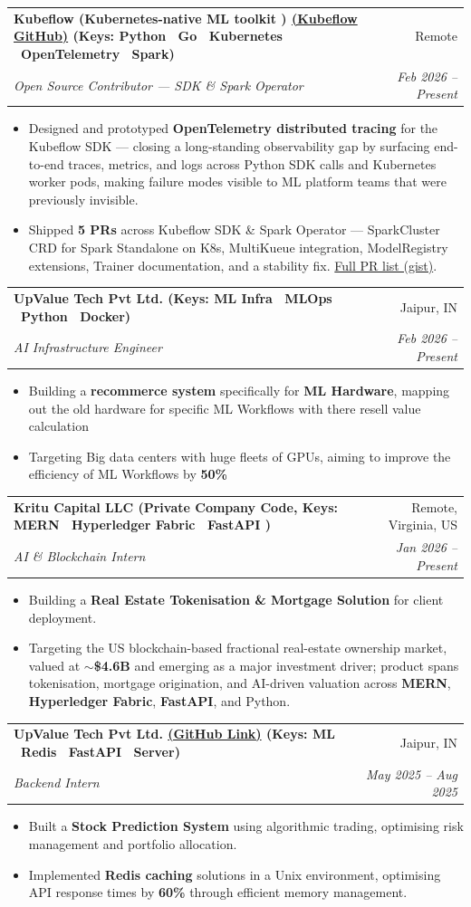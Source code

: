 \documentclass[letterpaper,11pt]{article}
\makeatletter
\newcommand{\resumeItem}[1]{
  \item\small{
    {#1 \vspace{-4pt}}
  }
}
\newcommand{\resumeSubheading}[4]{
  \vspace{-2pt}\item
    \begin{tabular*}{1.0\textwidth}[t]{l@{\extracolsep{\fill}}r}
      \textbf{#1} & #2 \\
      \textit{\small#3} & \textit{\small #4} \\
    \end{tabular*}\vspace{-7pt}
}
\newcommand{\resumeItemListStart}{\begin{itemize}}
\newcommand{\resumeItemListEnd}{\end{itemize}\vspace{-5pt}}
\makeatother
\begin{document}
    \resumeSubheading
  {Kubeflow \textnormal{\small(Kubernetes-native ML toolkit )} \hfill \href{https://github.com/kubeflow}{(Kubeflow GitHub)} \hfill \textnormal{\small(Keys: Python \textbar\ Go \textbar\ Kubernetes \textbar\ OpenTelemetry \textbar\ Spark)}}{Remote}
  {Open Source Contributor --- SDK \& Spark Operator}{Feb 2026 -- Present}
  \resumeItemListStart
    \resumeItem{Designed and prototyped \textbf{OpenTelemetry distributed tracing} for the Kubeflow SDK --- closing a long-standing observability gap by surfacing end-to-end traces, metrics, and logs across Python SDK calls and Kubernetes worker pods, making failure modes visible to ML platform teams that were previously invisible.}
    \resumeItem{Shipped \textbf{5 PRs} across Kubeflow SDK \& Spark Operator --- SparkCluster CRD for Spark Standalone on K8s, MultiKueue integration, ModelRegistry extensions, Trainer documentation, and a stability fix. \href{https://gist.github.com/1Ayush-Petwal/625bb3564b32d228d3d0a801fa6642bf}{Full PR list (gist)}.}
  \resumeItemListEnd

    \resumeSubheading
      {UpValue Tech Pvt Ltd. \hfill \textnormal{\small(Keys: ML Infra \textbar\ MLOps \textbar\ Python \textbar\ Docker)}}{Jaipur, IN}
      {AI Infrastructure Engineer}{Feb 2026 -- Present}
      \resumeItemListStart
        \resumeItem{Building a \textbf{recommerce system} specifically for \textbf{ML Hardware}, mapping out the old hardware for specific ML Workflows with there resell value calculation}
        \resumeItem{Targeting Big data centers with huge fleets of GPUs, aiming to improve the efficiency of ML Workflows by \textbf{50\%}}
      \resumeItemListEnd

    \resumeSubheading
      {Kritu Capital LLC \hfill \textnormal{\small(Private Company Code, Keys: MERN \textbar\ Hyperledger Fabric \textbar\ FastAPI )}}{Remote, Virginia, US}
      {AI \& Blockchain Intern}{Jan 2026 -- Present}
      \resumeItemListStart
        \resumeItem{Building a \textbf{Real Estate Tokenisation \& Mortgage Solution} for client deployment.}
        \resumeItem{Targeting the US blockchain-based fractional real-estate ownership market, valued at $\sim$\textbf{\$4.6B} and emerging as a major investment driver; product spans tokenisation, mortgage origination, and AI-driven valuation across \textbf{MERN}, \textbf{Hyperledger Fabric}, \textbf{FastAPI}, and Python.}
      \resumeItemListEnd

    \resumeSubheading
      {UpValue Tech Pvt Ltd. \hfill \href{https://github.com/1Ayush-Petwal/UpValue_Future_Price_Pred}{(GitHub Link)} \hfill \textnormal{\small(Keys: ML \textbar\ Redis \textbar\ FastAPI \textbar\ Server)}}{Jaipur, IN}
      {Backend Intern}{May 2025 -- Aug 2025}
      \resumeItemListStart
        \resumeItem{Built a \textbf{Stock Prediction System} using algorithmic trading, optimising risk management and portfolio allocation.}
        \resumeItem{Implemented \textbf{Redis caching} solutions in a Unix environment, optimising API response times by \textbf{60\%} through efficient memory management.}
      \resumeItemListEnd
\end{document}
